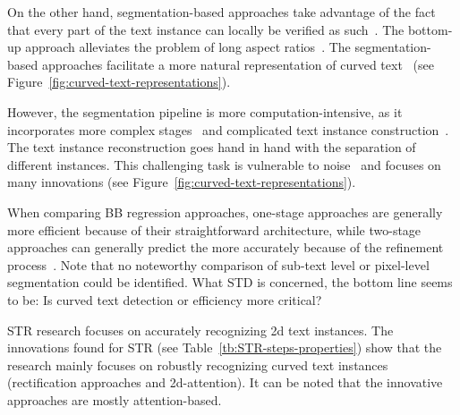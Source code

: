 On the other hand, segmentation-based approaches take advantage of the fact that every part of the
text instance can locally be verified as such~\citep{long_scene_2021}.
The bottom-up approach alleviates the problem of long aspect ratios~\citep{shi_detecting_2017}.
The segmentation-based approaches facilitate a more natural representation of curved
text~\citep{dai_fused_2018,long_scene_2021} (see Figure~\ref{fig:curved-text-representations}).

However, the segmentation pipeline is more computation-intensive, as it incorporates more complex
stages~\citep{dai_fused_2018} and complicated text instance
construction~\citep{xie_aggregation_2019,liao_real-time_2019,dai_fused_2018}.
The text instance reconstruction goes hand in hand with the separation of different instances.
This challenging task is vulnerable to noise~\citep{long_scene_2021} and focuses on
many innovations (see Figure~\ref{fig:curved-text-representations}).

When comparing \ac{BB} regression approaches, one-stage approaches are generally more
efficient  because of their straightforward architecture, while two-stage approaches can generally
predict the more accurately  because of the refinement process~\citep{lu_mimicdet_2020}.
Note that no noteworthy comparison of sub-text level or pixel-level segmentation could be identified.
What \ac{STD} is concerned, the bottom line seems to be:
Is curved text detection or efficiency more critical?

\ac{STR} research focuses on accurately recognizing 2d text instances.
The innovations found for \ac{STR} (see Table~\ref{tb:STR-steps-properties}) show that the research
mainly focuses on robustly recognizing curved text instances (rectification approaches and
2d-attention).
It can be noted that the innovative approaches are mostly attention-based.

